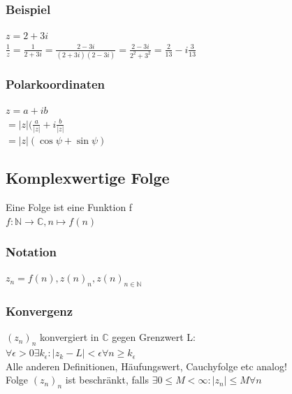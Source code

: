 \documentclass[fleqn]{scrbook}
\newcommand{\N}{\mathbb{N}}
\begin{document}
\subsubsection{Beispiel} $z = 2 +3i$\\
$\frac{1}{z} = \frac{1}{2+3i} = \frac{2-3i}{(2+3i)(2-3i)} = \frac{2-3i}{2^2 + 3^2} = \frac{2}{13} - i\frac{3}{13}$
\subsubsection{Polarkoordinaten} $z = a + ib$\\
$=|z|(\frac{a}{|z|}+i\frac{b}{|z|}$\\
$=|z|(\cos \psi + \sin \psi)$
\subsection{Komplexwertige Folge} Eine Folge ist eine Funktion f\\
$f:\N\rightarrow \mathbb{C},n\mapsto f(n)$
\subsubsection{Notation} $z_n = f(n),z(n)_n, z(n)_{n\in\N}$
\subsubsection{Konvergenz} $(z_n)_n$ konvergiert in $\mathbb{C}$ gegen Grenzwert L:\\
$\forall\epsilon > 0 \exists k_\epsilon : |z_k - L| < \epsilon \forall n \geq k_\epsilon$\\Alle anderen Definitionen, Häufungswert, Cauchyfolge etc analog!\\
Folge $(z_n)_n$ ist beschränkt, falls $\exists 0 \leq M < \infty:|z_n|\leq M \forall n$
\end{document}
